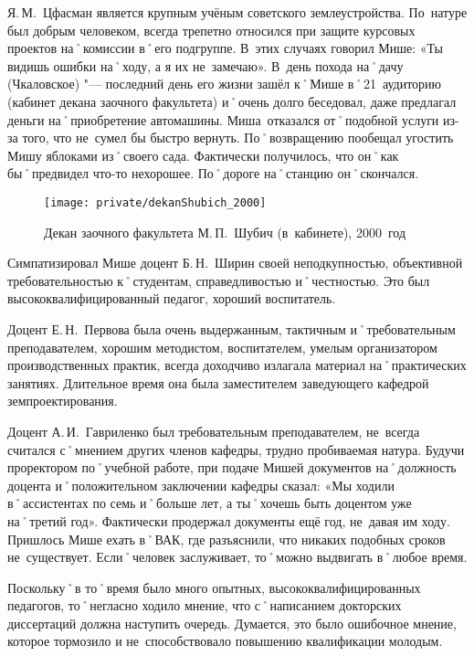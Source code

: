 Я.\,М.~Цфасман является крупным учёным советского землеустройства. По~натуре был добрым человеком, всегда трепетно относился при защите курсовых проектов на˚комиссии в˚его подгруппе. В~этих случаях говорил Мише: «Ты видишь ошибки на˚ходу, а я их не~замечаю». В~день похода на˚дачу (Чкаловское) "--- последний день его жизни зашёл к˚Мише в˚21~аудиторию (кабинет декана заочного факультета) и˚очень долго беседовал, даже предлагал деньги на˚приобретение автомашины. Миша~отказался от˚подобной услуги из-за того, что не~сумел бы быстро вернуть. По˚возвращению пообещал угостить Мишу яблоками из˚своего сада. Фактически получилось, что он˚как бы˚предвидел что-то нехорошее. По˚дороге на˚станцию он˚скончался.

\begin{figure}[h]
\texttt{[image: private/dekanShubich\_2000]}
\caption{Декан заочного факультета М.\,П.~Шубич (в~кабинете), 2000~год}
\label{fig:dekanShubich_2000}
\end{figure}

Симпатизировал Мише доцент Б.\,Н.~Ширин своей неподкупностью, объективной требовательностью к˚студентам, справедливостью и˚честностью. Это был высококвалифицированный педагог, хороший воспитатель.

Доцент Е.\,Н.~Первова была очень выдержанным, тактичным и˚требовательным преподавателем, хорошим методистом, воспитателем, умелым организатором производственных практик, всегда доходчиво излагала материал на˚практических занятиях. Длительное время она была заместителем заведующего кафедрой земпроектирования.

Доцент А.\,И.~Гавриленко был требовательным преподавателем, не~всегда считался с˚мнением других членов кафедры, трудно пробиваемая натура. Будучи проректором по˚учебной работе, при подаче Мишей документов на˚должность доцента и˚положительном заключении кафедры сказал: «Мы ходили в˚ассистентах по семь и˚больше лет, а ты˚хочешь быть доцентом уже на˚третий год». Фактически продержал документы ещё год, не~давая им ходу. Пришлось Мише ехать в˚ВАК, где разъяснили, что никаких подобных сроков не~существует. Если˚человек заслуживает, то˚можно выдвигать в˚любое время.

Поскольку˚в то˚время было много опытных, высококвалифицированных педагогов, то˚негласно ходило мнение, что с˚написанием докторских диссертаций должна наступить очередь. Думается, это было ошибочное мнение, которое тормозило и не~способствовало повышению квалификации молодым.

